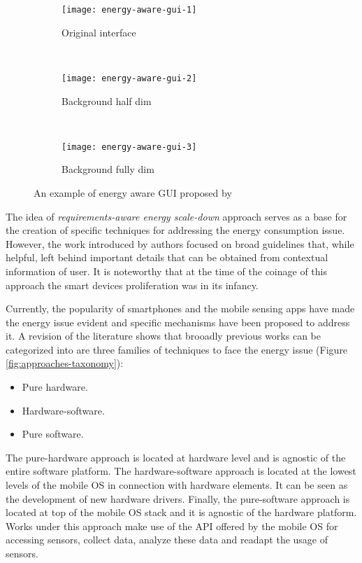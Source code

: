 \begin{figure}
        \centering
        \begin{subfigure}[b]{0.3\textwidth}
                \texttt{[image: energy-aware-gui-1]}
                \caption{Original interface}
                \label{fig:energy-aware-gui-1}
        \end{subfigure}
        ~
        \begin{subfigure}[b]{0.3\textwidth}
                \texttt{[image: energy-aware-gui-2]}
                \caption{Background half dim}
                \label{fig:energy-aware-gui-2}
        \end{subfigure}
        ~
        \begin{subfigure}[b]{0.3\textwidth}
                \texttt{[image: energy-aware-gui-3]}
                \caption{Background fully dim}
                \label{fig:energy-aware-gui-3}
        \end{subfigure}
        \caption[An example of energy aware GUI by \protect\cite{Mayo2004}]{An example of energy aware GUI proposed by \protect\cite{Mayo2004}}
        \label{fig-scaling-down-screen-usage}
\end{figure}

The idea of \emph{requirements-aware energy scale-down} approach serves as a base for the creation of specific techniques for addressing the energy consumption issue.
However, the work introduced by authors focused on broad guidelines that, while helpful, left behind important details that can be obtained from contextual information of user.
It is noteworthy that at the time of the coinage of this approach the smart devices proliferation was in its infancy.

Currently, the popularity of smartphones and the mobile sensing apps have made the energy issue evident and specific mechanisms have been proposed to address it.
A revision of the literature shows that brooadly previous works can be categorized into are three families of techniques to face the energy issue (Figure \ref{fig:approaches-taxonomy}): 

\begin{itemize}
  \item Pure hardware.
  \item Hardware-software.
  \item Pure software.
\end{itemize}

The pure-hardware approach is located at hardware level and is agnostic of the entire software platform.
The hardware-software approach is located at the lowest levels of the mobile OS in connection with hardware elements.
It can be seen as the development of new hardware drivers.
Finally, the pure-software approach is located at top of the mobile OS stack and it is agnostic of the hardware platform.
Works under this approach make use of the API offered by the mobile OS for accessing sensors, collect data, analyze these data and readapt the usage of sensors.

